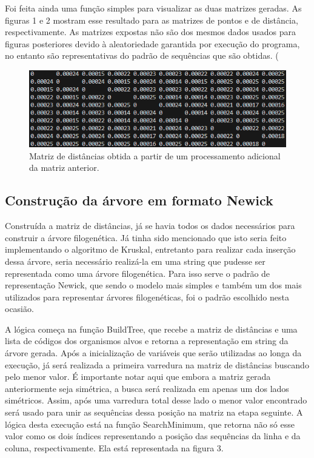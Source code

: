\documentclass[brazilian,12pt,a4paper,final]{article}
\begin{document}
	Foi feita ainda uma função simples para visualizar as duas matrizes geradas. As figuras 1 e 2 mostram esse resultado para as matrizes de pontos e de distância, respectivamente. As matrizes expostas não são dos mesmos dados usados para figuras posteriores devido à aleatoriedade garantida por execução do programa, no entanto são representativas do padrão de sequências que são obtidas.
\left( 
	
	\begin{figure}[hbtp]
		\begin{center}
			\includegraphics[]{matrizDistancia.png}
			\caption{Matriz de distâncias obtida a partir de um processamento adicional da matriz anterior.}
			\label{fig}
		\end{center}
	\end{figure}
	
	\subsection{Construção da árvore em formato Newick}
	
	Construída a matriz de distâncias, já se havia todos os dados necessários para construir a árvore filogenética. Já tinha sido mencionado que isto seria feito implementando o algoritmo de Kruskal, entretanto para realizar cada inserção dessa árvore, seria necessário realizá-la em uma string que pudesse ser representada como uma árvore filogenética. Para isso serve o padrão de representação Newick, que sendo o modelo mais simples e também um dos mais utilizados para representar árvores filogenéticas, foi o padrão escolhido nesta ocasião. 
	\vspace{0.5cm}
	
	A lógica começa na função BuildTree, que recebe a matriz de distâncias e uma lista de códigos dos organismos alvos e retorna a representação em string da árvore gerada. Após a inicialização de variáveis que serão utilizadas ao longa da execução, já será realizada a primeira varredura na matriz de distâncias buscando pelo menor valor. É importante notar aqui que embora a matriz gerada anteriormente seja simétrica, a busca será realizada em apenas um dos lados simétricos. Assim, após uma varredura total desse lado o menor valor encontrado será usado para unir as sequências dessa posição na matriz na etapa seguinte. A lógica desta execução está na função SearchMinimum, que retorna não só esse valor como os dois índices representando a posição das sequências da linha e da coluna, respectivamente. Ela está representada na figura 3.
	
\end{document}
